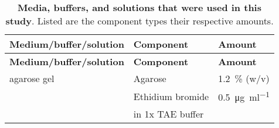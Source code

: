 \begin{longtable}{@{} l l l @{}}
    \caption{\textbf{Media, buffers, and solutions that were used in this study}. Listed are the component types their respective amounts.} \label{tab:materials_media} \\
        \toprule
        \textbf{Medium/buffer/solution} & \textbf{Component} & \textbf{Amount} \\
        \midrule
        \endfirsthead
        \toprule
        \textbf{Medium/buffer/solution} & \textbf{Component} & \textbf{Amount} \\
        \midrule
        \endhead
        agarose gel & Agarose & \SI{1.2}{\percent} (w/v) \\
                        & Ethidium bromide & \SI{0.5}{\micro\gram\per\milli\litre} \\
                        & in 1x TAE buffer & \\[1ex]
        

\end{longtable}
